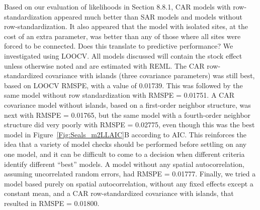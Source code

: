 \documentclass[12pt, titlepage]{article}
\begin{document}
Based on our evaluation of likelihoods in Section 8.8.1, CAR models with row-standardization appeared much better than SAR models and models without row-standardization.  It also appeared that the model with isolated sites, at the cost of an extra parameter, was better than any of those where all sites were forced to be connected.  Does this translate to predictive performance?  We investigated using LOOCV. All models discussed will contain the stock effect unless otherwise noted and are estimated with REML. The CAR row-standardized covariance with islands (three covariance parameters) was still best, based on LOOCV RMSPE, with a value of 0.01739.  This was followed by the same model without row standardization with RMSPE = 0.01751.  A CAR covariance model without islands, based on a first-order neighbor structure, was next with RMSPE = 0.01765, but the same model with a fourth-order neighbor structure did very poorly with RMSPE = 0.02775, even though this was the best model in Figure~\ref{Fig:Seals_m2LLAIC}B according to AIC.  This reinforces the idea that a variety of model checks should be performed before settling on any one model, and it can be difficult to come to a decision when different criteria identify different ``best'' models.  A model without any spatial autocorrelation, assuming uncorrelated random errors, had RMSPE = 0.01777.  Finally, we tried a model based purely on spatial autocorrelation, without any fixed effects except a constant mean, and a CAR row-standardized covariance with islands, that resulted in RMSPE = 0.01800.
\end{document}
